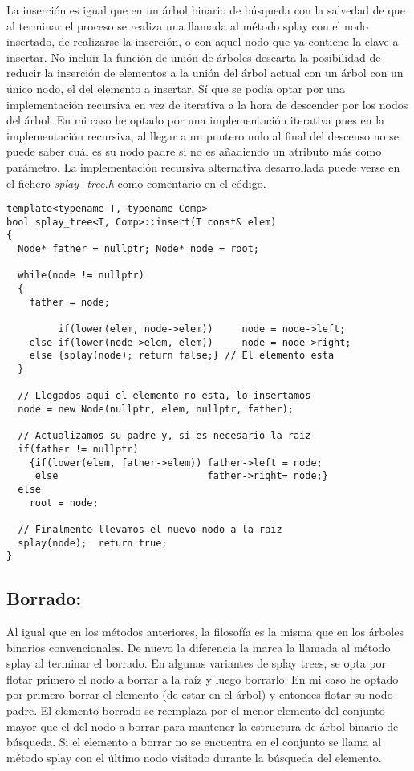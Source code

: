 \documentclass[letterpaper,12pt]{article}
\begin{document}
La inserción es igual que en un árbol binario de búsqueda con la salvedad de 
que al terminar el proceso se realiza una llamada al método splay con el nodo 
insertado, de realizarse la inserción, o con aquel nodo que ya contiene la 
clave a insertar. No incluir la función de unión de árboles descarta la 
posibilidad de reducir la inserción de elementos a la unión del árbol actual
con un árbol con un único nodo, el del elemento a insertar. Sí que se podía
optar por una implementación recursiva en vez de iterativa a la hora de 
descender por los nodos del árbol. En mi caso he optado por una implementación
iterativa pues en la implementación recursiva, al llegar a un puntero nulo al
final del descenso no se puede saber cuál es su nodo padre si no es añadiendo
un atributo más como parámetro. La implementación recursiva alternativa 
desarrollada puede verse en el fichero \textit{splay\_tree.h} como comentario
en el código.

\begin{lstlisting}
template<typename T, typename Comp>
bool splay_tree<T, Comp>::insert(T const& elem)
{
  Node* father = nullptr; Node* node = root;

  while(node != nullptr)
  {
    father = node;

         if(lower(elem, node->elem))     node = node->left;
    else if(lower(node->elem, elem))     node = node->right;
    else {splay(node); return false;} // El elemento esta
  }

  // Llegados aqui el elemento no esta, lo insertamos
  node = new Node(nullptr, elem, nullptr, father);

  // Actualizamos su padre y, si es necesario la raiz
  if(father != nullptr)
    {if(lower(elem, father->elem)) father->left = node;
     else                          father->right= node;}
  else
    root = node;

  // Finalmente llevamos el nuevo nodo a la raiz
  splay(node);  return true;
}
\end{lstlisting}
\subsection{Borrado:}

Al igual que en los métodos anteriores, la filosofía es la misma que en los
árboles binarios convencionales. De nuevo la diferencia la marca la llamada al
método splay al terminar el borrado. En algunas variantes de splay trees, se 
opta por flotar primero el nodo a borrar a la raíz y luego borrarlo. En mi 
caso he optado por primero borrar el elemento (de estar en el árbol) y
entonces flotar su nodo padre. El elemento borrado se reemplaza por el menor 
elemento del conjunto mayor que el del nodo a borrar para mantener la 
estructura de árbol binario de búsqueda. Si el elemento a borrar no se 
encuentra en el conjunto se llama al método splay con el último nodo visitado 
durante la búsqueda del elemento.
\end{document}
